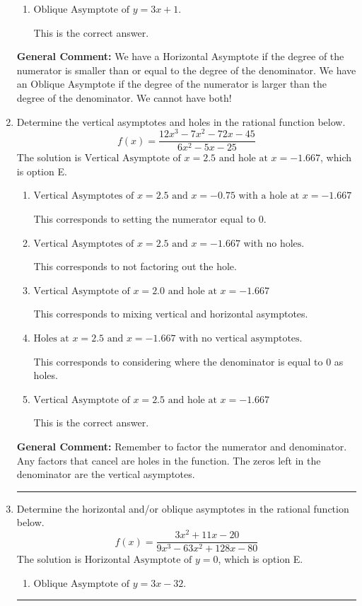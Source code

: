 \documentclass{extbook}[14pt]
\newcommand{\litem}[1]{\item #1

\rule{\textwidth}{0.4pt}}
\begin{document}
\begin{enumerate}
{\begin{enumerate}[label=\Alph*.]
This corresponds to considering where the denominator is equal to 0 as horizontal asymptote.
\item \( \text{Oblique Asymptote of } y = 3x + 1. \)

This is the correct answer.
\end{enumerate}

\textbf{General Comment:} We have a Horizontal Asymptote if the degree of the numerator is smaller than or equal to the degree of the denominator. We have an Oblique Asymptote if the degree of the numerator is larger than the degree of the denominator. We cannot have both!
}
\litem{
Determine the vertical asymptotes and holes in the rational function below.
\[ f(x) = \frac{12x^{3} -7 x^{2} -72 x -45}{6x^{2} -5 x -25} \]The solution is \( \text{Vertical Asymptote of } x = 2.5 \text{ and hole at } x = -1.667 \), which is option E.\begin{enumerate}[label=\Alph*.]
\item \( \text{Vertical Asymptotes of } x = 2.5 \text{ and } x = -0.75 \text{ with a hole at } x = -1.667 \)

This corresponds to setting the numerator equal to 0.
\item \( \text{Vertical Asymptotes of } x = 2.5 \text{ and } x = -1.667 \text{ with no holes.} \)

This corresponds to not factoring out the hole.
\item \( \text{Vertical Asymptote of } x = 2.0 \text{ and hole at } x = -1.667 \)

This corresponds to mixing vertical and horizontal asymptotes.
\item \( \text{Holes at } x = 2.5 \text{ and } x = -1.667 \text{ with no vertical asymptotes.} \)

This corresponds to considering where the denominator is equal to 0 as holes.
\item \( \text{Vertical Asymptote of } x = 2.5 \text{ and hole at } x = -1.667 \)

This is the correct answer.
\end{enumerate}

\textbf{General Comment:} Remember to factor the numerator and denominator. Any factors that cancel are holes in the function. The zeros left in the denominator are the vertical asymptotes.
}
\litem{
Determine the horizontal and/or oblique asymptotes in the rational function below.
\[ f(x) = \frac{3x^{2} +11 x -20}{9x^{3} -63 x^{2} +128 x -80} \]The solution is \( \text{Horizontal Asymptote of } y = 0 \), which is option E.\begin{enumerate}[label=\Alph*.]
\item \( \text{Oblique Asymptote of } y = 3x -32. \)


\end{enumerate}}
\end{enumerate}
\end{document}
